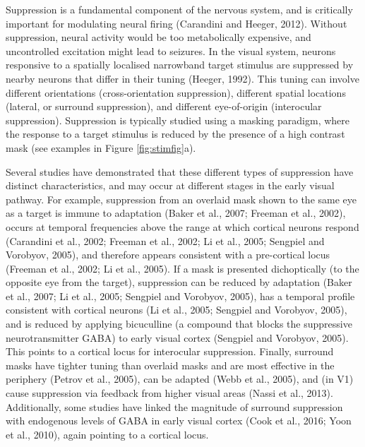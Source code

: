 \documentclass[]{article}
\begin{document}
Suppression is a fundamental component of the nervous system, and is critically important for modulating neural firing (Carandini and Heeger, 2012). Without suppression, neural activity would be too metabolically expensive, and uncontrolled excitation might lead to seizures. In the visual system, neurons responsive to a spatially localised narrowband target stimulus are suppressed by nearby neurons that differ in their tuning (Heeger, 1992). This tuning can involve different orientations (cross-orientation suppression), different spatial locations (lateral, or surround suppression), and different eye-of-origin (interocular suppression). Suppression is typically studied using a masking paradigm, where the response to a target stimulus is reduced by the presence of a high contrast mask (see examples in Figure \ref{fig:stimfig}a).

Several studies have demonstrated that these different types of suppression have distinct characteristics, and may occur at different stages in the early visual pathway. For example, suppression from an overlaid mask shown to the same eye as a target is immune to adaptation (Baker et al., 2007; Freeman et al., 2002), occurs at temporal frequencies above the range at which cortical neurons respond (Carandini et al., 2002; Freeman et al., 2002; Li et al., 2005; Sengpiel and Vorobyov, 2005), and therefore appears consistent with a pre-cortical locus (Freeman et al., 2002; Li et al., 2005). If a mask is presented dichoptically (to the opposite eye from the target), suppression can be reduced by adaptation (Baker et al., 2007; Li et al., 2005; Sengpiel and Vorobyov, 2005), has a temporal profile consistent with cortical neurons (Li et al., 2005; Sengpiel and Vorobyov, 2005), and is reduced by applying bicuculline (a compound that blocks the suppressive neurotransmitter GABA) to early visual cortex (Sengpiel and Vorobyov, 2005). This points to a cortical locus for interocular suppression. Finally, surround masks have tighter tuning than overlaid masks and are most effective in the periphery (Petrov et al., 2005), can be adapted (Webb et al., 2005), and (in V1) cause suppression via feedback from higher visual areas (Nassi et al., 2013). Additionally, some studies have linked the magnitude of surround suppression with endogenous levels of GABA in early visual cortex (Cook et al., 2016; Yoon et al., 2010), again pointing to a cortical locus.
\end{document}
